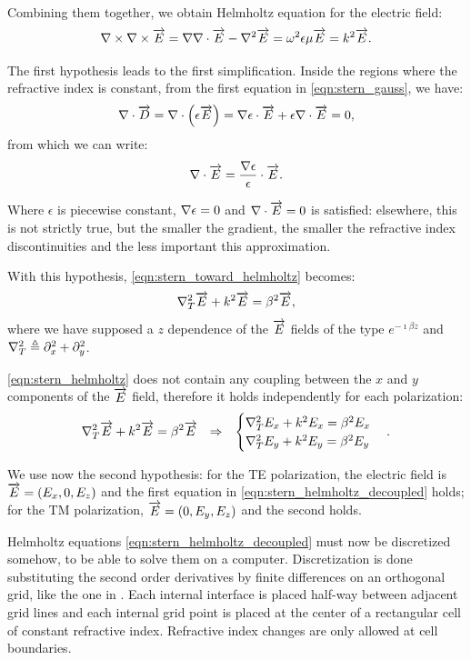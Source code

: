 Combining them together, we obtain Helmholtz equation for the electric
field:
\begin{equation} \label{eqn:stern_toward_helmholtz}
{\nabla\times {\nabla\times \overrightarrow{E}}} = {\nabla {\nabla\cdot \overrightarrow{E}}} - {\nabla^2 \overrightarrow{E}} = \omega^2 \epsilon \mu \overrightarrow{E} = k^2 \overrightarrow{E}.
\end{equation}

The first hypothesis leads to the first simplification. Inside the
regions where the refractive index is constant, from the first
equation in \eqref{eqn:stern_gauss}, we have:
\begin{equation*}
{\nabla\cdot \overrightarrow{D}} = {\nabla \cdot \left( \epsilon \overrightarrow{E} \right)} = {{\nabla \epsilon} \cdot \overrightarrow{E}} +
\epsilon {\nabla\cdot \overrightarrow{E}} = 0,
\end{equation*}
from which we can write:
\begin{equation*}
{\nabla\cdot \overrightarrow{E}} = {\frac{{\nabla \epsilon}}{\epsilon} \cdot \overrightarrow{E}}.
\end{equation*}

Where $\epsilon$ is piecewise constant, ${\nabla \epsilon} = 0$ and
${\nabla \cdot \overrightarrow{E}} = 0$ is satisfied: elsewhere, this is not strictly true, but
the smaller the gradient, the smaller the refractive index
discontinuities and the less important this approximation.

With this hypothesis, \eqref{eqn:stern_toward_helmholtz} becomes:
\begin{equation} \label{eqn:stern_helmholtz}
{\nabla^2_T \overrightarrow{E}} + k^2 \overrightarrow{E} = \beta^2 \overrightarrow{E},
\end{equation}
where we have supposed a $z$ dependence of the $\overrightarrow{E}$ fields of the
type $e^{-\imath \beta z}$ and ${\nabla^2_T } \triangleq \partial_x^2 + \partial_y^2$.

\eqref{eqn:stern_helmholtz} does not contain any coupling between
the $x$ and $y$ components of the $\overrightarrow{E}$ field, therefore it holds
independently for each polarization:
\begin{align} \label{eqn:stern_helmholtz_decoupled}
{\nabla^2_T \overrightarrow{E}} + k^2 \overrightarrow{E} = \beta^2 \overrightarrow{E} && \Rightarrow &&
\begin{cases}
  {\nabla^2_T E_x} + k^2 E_x = \beta^2 E_x \\
  {\nabla^2_T E_y} + k^2 E_y = \beta^2 E_y
\end{cases} . \end{align}

We use now the second hypothesis: for the TE polarization, the
electric field is $\overrightarrow{E} = (E_x,0,E_z)$ and the first equation in
\eqref{eqn:stern_helmholtz_decoupled} holds; for the TM polarization,
$\overrightarrow{E} = (0,E_y,E_z)$ and the second holds.

Helmholtz equations \eqref{eqn:stern_helmholtz_decoupled} must now be
discretized somehow, to be able to solve them on a
computer. Discretization is done substituting the second order
derivatives by finite differences on an orthogonal grid, like the one
in . Each internal interface is placed half-way
between adjacent grid lines and each internal grid point is placed at
the center of a rectangular cell of constant refractive
index. Refractive index changes are only allowed at cell boundaries.

